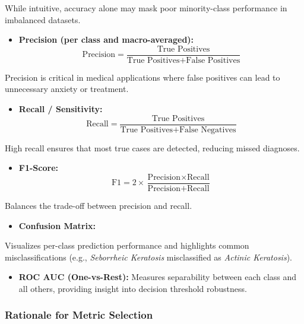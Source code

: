 \documentclass[
  12pt,
  oneside]{article}
\providecommand{\tightlist}{%
  \setlength{\itemsep}{0pt}\setlength{\parskip}{0pt}}
\begin{document}
While intuitive, accuracy alone may mask poor minority-class performance
in imbalanced datasets.

\begin{itemize}
\tightlist
\item
  \textbf{Precision (per class and macro-averaged):} \[
  \text{Precision} = \frac{\text{True Positives}}{\text{True Positives} + \text{False Positives}}
  \]
\end{itemize}

Precision is critical in medical applications where false positives can
lead to unnecessary anxiety or treatment.

\begin{itemize}
\tightlist
\item
  \textbf{Recall / Sensitivity:} \[
  \text{Recall} = \frac{\text{True Positives}}{\text{True Positives} + \text{False Negatives}}
  \]
\end{itemize}

High recall ensures that most true cases are detected, reducing missed
diagnoses.

\begin{itemize}
\tightlist
\item
  \textbf{F1-Score:} \[
  \text{F1} = 2 \times \frac{\text{Precision} \times \text{Recall}}{\text{Precision} + \text{Recall}}
  \]
\end{itemize}

Balances the trade-off between precision and recall.

\begin{itemize}
\tightlist
\item
  \textbf{Confusion Matrix:}
\end{itemize}

Visualizes per-class prediction performance and highlights common
misclassifications (e.g., \emph{Seborrheic Keratosis} misclassified as
\emph{Actinic Keratosis}).

\begin{itemize}
\tightlist
\item
  \textbf{ROC AUC (One-vs-Rest):} Measures separability between each
  class and all others, providing insight into decision threshold
  robustness.
\end{itemize}

\subsubsection{Rationale for Metric
Selection}\label{rationale-for-metric-selection}
\end{document}
